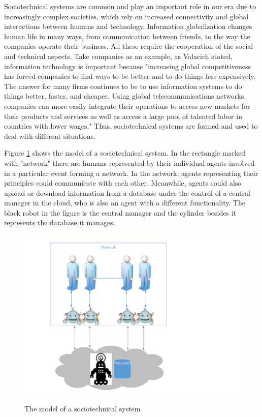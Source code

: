 Sociotechnical systems are common and play an important role in our era due to increasingly complex societies, which rely on increased connectivity and global interactions between humans and technology. Information globalization changes human life in many ways, from communication between friends, to the way the companies operate their business. All these require the cooperation of the social and technical aspects. Take companies as an example, as Valacich \cite{valacich2009information} stated, information technology is important because "increasing global competitiveness has forced companies to find ways to be better and to do things less expensively. The answer for many firms continues to be to use information systems to do things better, faster, and cheaper. Using global telecommunications networks, companies can more easily integrate their operations to access new markets for their products and services as well as access a large pool of talented labor in countries with lower wages." Thus, sociotechnical systems are formed and used to deal with different situations. 

Figure \ref{ch1:fmodelsocio} shows the model of a sociotechnical system. In the rectangle marked with "network" there are humans represented by their individual agents involved in a particular event forming a network. In the network, agents representing their principles could communicate with each other. Meanwhile, agents could also upload or download information from a database under the control of a central manager in the cloud, who is also an agent with a different functionality. The black robot in the figure is the central manager and the cylinder besides it represents the database it manages. 

\begin{figure}
\centering
\includegraphics[scale=0.5]{chap1/chap1-model.pdf}
\caption{The model of a sociotechnical system}
\label{ch1:fmodelsocio}
\end{figure}

